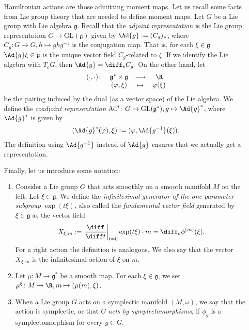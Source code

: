 Hamiltonian actions are those admitting moment maps. Let us recall some facts from Lie group theory that are needed to define moment maps. Let \(G\) be a Lie group with Lie algebra \(\mathfrak{g}\). Recall that the \textit{adjoint representation} is the Lie group representation \(G \to \mathrm{GL}(\mathfrak{g})\) given by \(\Ad{g}:=(C_g)_*\), where \(C_g\colon G \to G, h \mapsto ghg^{-1}\) is the conjugation map. That is, for each \(\xi \in \mathfrak{g}\) \(\Ad{g}\xi\in \mathfrak{g}\) is the unique vector field \(C_g\)-related to \(\xi\). If we identify the Lie algebra with \(T_eG\), then \(\Ad{g}=\diff_e C_g\). On the other hand, let 
\begin{equation} \label{eq_def_pairing_lie_alg}
\begin{array}{cccc}
    (\cdot, \cdot)\colon & \mathfrak{g}^* \times \mathfrak{g} & \longrightarrow & \R \\
    & (\varphi, \xi) & \mapsto & \varphi(\xi)
\end{array}
\end{equation}
be the pairing induced by the dual (as a vector space) of the Lie algebra. We define the \textit{coadjoint representation} \(\mathrm{Ad}^*\colon G \to \mathrm{GL}(\mathfrak{g}^*), g \mapsto \Ad{g}^*\), where \(\Ad{g}^*\) is given by 
\[
(\Ad{g}^*(\varphi), \xi):=(\varphi, \Ad{g^{-1}}(\xi)).
\]
The definition using \(\Ad{g^{-1}}\) instead of \(\Ad{g}\) ensures that we actually get a representation. 

Finally, let us introduce some notation:
\begin{enumerate}
    \item Consider a Lie group \(G\) that acts smoothly on a smooth manifold \(M\) on the left. Let \(\xi \in \mathfrak{g}\). We define the \textit{infinitesimal generator of the one-parameter subgroup}\label{infinitesimal generator} \(\exp(t\xi)\), also called the \textit{fundamental vector field} generated by \(\xi \in \mathfrak{g}\) as the vector field
    \begin{equation} \label{def_hat_X}
    X_{\xi, m}:=\left. \frac{\diff}{\diff t} \right|_{t=0}\exp(t\xi)\cdot m = \diff _ e\phi^{(m)}(\xi).
    \end{equation}
    For a right action the definition is analogous. We also say that the vector \(X_{\xi, m}\) is the infinitesimal action of \(\xi\) on \(m\).
    \item Let \(\mu\colon M \to \mathfrak{g}^*\) be a smooth map. For each \(\xi \in \mathfrak{g}\), we set \(\mu^\xi\colon M \to \R, m \mapsto (\mu(m), \xi)\).
    \item When a Lie group \(G\) acts on a symplectic manifold \((M, \omega)\), we say that the action is symplectic, or that \(G\) \textit{acts by symplectomorphisms}, if \(\phi_g\) is a symplectomorphism for every \(g \in G\).
\end{enumerate}

